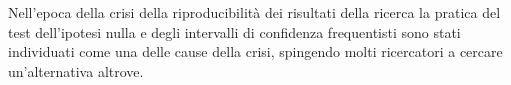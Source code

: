 Nell'epoca della crisi della riproducibilità dei risultati della ricerca \citep{baker2016reproducibility} la pratica del test dell'ipotesi nulla e degli intervalli di confidenza frequentisti sono stati individuati come una delle cause della crisi, spingendo molti ricercatori a cercare un'alternativa altrove. 

%
%

